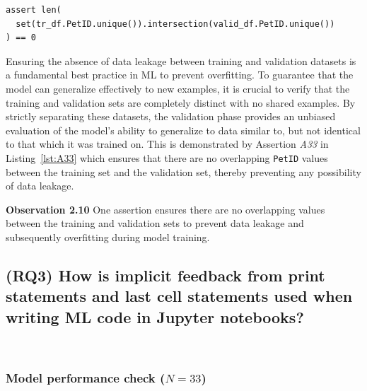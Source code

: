 \documentclass[smallextended]{svjour3}       %
\newcommand{\highlight}[1]{\begin{framed}%
  \noindent#1
\end{framed}}
\providecommand{\DIFaddbegin}{} %
\providecommand{\DIFaddend}{} %
\providecommand{\DIFdelbegin}{} %
\providecommand{\DIFdelend}{} %
\newcommand{\DIFscaledelfig}{0.5}
\newlength{\DIFdelgraphicswidth} %
\newlength{\DIFdelgraphicsheight} %
\newcommand{\DIFaddincludegraphics}[2][]{{\color{blue}\fbox{\DIFOincludegraphics[#1]{#2}}}} %
\newcommand{\DIFdelincludegraphics}[2][]{%
\sbox{\DIFdelgraphicsbox}{\DIFOincludegraphics[#1]{#2}}%
\settoboxwidth{\DIFdelgraphicswidth}{\DIFdelgraphicsbox} %
\settoboxtotalheight{\DIFdelgraphicsheight}{\DIFdelgraphicsbox} %
\scalebox{\DIFscaledelfig}{%
\parbox[b]{\DIFdelgraphicswidth}{\usebox{\DIFdelgraphicsbox}\\[-\baselineskip] \rule{\DIFdelgraphicswidth}{0em}}\llap{\resizebox{\DIFdelgraphicswidth}{\DIFdelgraphicsheight}{%
\setlength{\unitlength}{\DIFdelgraphicswidth}%
\begin{picture}(1,1)%
\thicklines\linethickness{2pt} %
{\color[rgb]{1,0,0}\put(0,0){\framebox(1,1){}}}%
{\color[rgb]{1,0,0}\put(0,0){\line( 1,1){1}}}%
{\color[rgb]{1,0,0}\put(0,1){\line(1,-1){1}}}%
\end{picture}%
}\hspace*{3pt}}} %
} %
\DeclareRobustCommand{\DIFaddbegin}{\DIFOaddbegin \let\includegraphics\DIFaddincludegraphics} %
\DeclareRobustCommand{\DIFaddend}{\DIFOaddend \let\includegraphics\DIFOincludegraphics} %
\DeclareRobustCommand{\DIFdelbegin}{\DIFOdelbegin \let\includegraphics\DIFdelincludegraphics} %
\DeclareRobustCommand{\DIFdelend}{\DIFOaddend \let\includegraphics\DIFOincludegraphics} %
\begin{document}
\begin{lstlisting}[caption={Assertion \emph{A33} used to ensure that the training and validation sets do not contain any overlapping values.}, label={lst:A33}]
assert len(
  set(tr_df.PetID.unique()).intersection(valid_df.PetID.unique())
) == 0
\end{lstlisting}

Ensuring the absence of data leakage between training and validation datasets is a fundamental best practice in ML to prevent overfitting. To guarantee that the model can generalize effectively to new examples, it is crucial to verify that the training and validation sets are completely distinct with no shared examples. By strictly separating these datasets, the validation phase provides an unbiased evaluation of the model's ability to generalize to data similar to, but not identical to that which it was trained on. This is demonstrated by Assertion \emph{A33} in Listing~\ref{lst:A33} which ensures that there are no overlapping \lstinline{PetID} values between the training set and the validation set, thereby preventing any possibility of data leakage.

\DIFdelbegin %
\DIFdelend \DIFaddbegin \highlight{\textbf{Observation 2.10} One assertion ensures there are no overlapping values between the training and validation sets to prevent data leakage and subsequently overfitting during model training.}
\DIFaddend 

\subsection{(RQ3) How is implicit feedback from print statements and last cell statements used when writing ML code in Jupyter notebooks?}~\label{sec:result-implicit}

\subsubsection{Model performance check ($N = 33$)}
\end{document}
